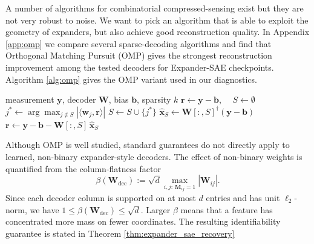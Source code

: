 \documentclass{article}
\theoremstyle{plain}
\theoremstyle{definition}
\theoremstyle{remark}
\begin{document}
A number of algorithms for combinatorial compressed-sensing exist but they are not very robust to noise.
%
We want to pick an algorithm that is able to exploit the geometry of expanders, but also achieve good reconstruction quality.
%
In Appendix \ref{app:omp} we compare several sparse-decoding algorithms and find that Orthogonal Matching Pursuit (OMP) \citep{tropp2007omp} gives the strongest reconstruction improvement among the tested decoders for Expander-SAE checkpoints. Algorithm \ref{alg:omp} gives the OMP variant used in our diagnostics.
%
\begin{algorithm}[h]
    \caption{OMP for Expander SAE}
    \label{alg:omp}
    \begin{algorithmic}[1]
        \REQUIRE measurement $\mathbf{y}$, decoder $\mathbf{W}$, bias $\mathbf{b}$, sparsity $k$
        \STATE $\mathbf{r} \leftarrow \mathbf{y} - \mathbf{b}$, $\quad S \leftarrow \emptyset$
            \STATE $j^{*} \leftarrow \arg\max_{j \notin S} |\langle \mathbf{w}_j, \mathbf{r} \rangle|$
            \STATE $S \leftarrow S \cup \{j^{*}\}$
            \STATE $\hat{\mathbf{x}}_S \leftarrow \mathbf{W}[:, S]^{\dagger} (\mathbf{y} - \mathbf{b})$
            \STATE $\mathbf{r} \leftarrow \mathbf{y} - \mathbf{b} - \mathbf{W}[:, S]\,\hat{\mathbf{x}}_S$
        \ENDFOR
    \end{algorithmic}
\end{algorithm}


%
Although OMP is well studied, standard guarantees do not directly apply to learned, non-binary expander-style decoders.
%
The effect of non-binary weights is quantified from the column-flatness factor
%
\begin{equation}
\label{eq:decoder_flatness}
    \beta(\mathbf{W}_{\mathrm{dec}})
    :=
    \sqrt d
    \max_{i,j:\,\mathbf{M}_{ij}=1}
    |\mathbf{W}_{ij}|.
\end{equation}
%
Since each decoder column is supported on at most \(d\) entries and has unit \(\ell_2\)-norm, we have $1\le \beta(\mathbf{W}_{\mathrm{dec}})\le \sqrt d$.
%
Larger \(\beta\) means that a feature has concentrated more mass on fewer coordinates.
%
The resulting identifiability guarantee is stated in Theorem \ref{thm:expander_sae_recovery}
\end{document}
